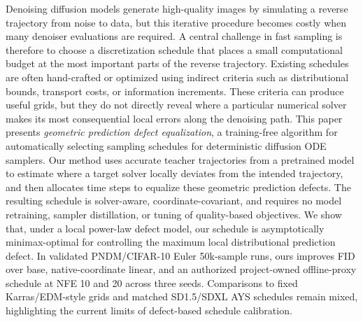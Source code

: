 Denoising diffusion models generate high-quality images by simulating a
reverse trajectory from noise to data, but this iterative procedure becomes
costly when many denoiser evaluations are required. A central challenge in fast
sampling is therefore to choose a discretization schedule that places a small
computational budget at the most important parts of the reverse trajectory.
Existing schedules are often hand-crafted or optimized using indirect criteria
such as distributional bounds, transport costs, or information increments.
These criteria can produce useful grids, but they do not directly reveal where
a particular numerical solver makes its most consequential local errors along
the denoising path. This paper presents \emph{geometric prediction defect
equalization}, a training-free algorithm for automatically selecting sampling
schedules for deterministic diffusion ODE samplers. Our method uses accurate
teacher trajectories from a pretrained model to estimate where a target solver
locally deviates from the intended trajectory, and then allocates time steps to
equalize these geometric prediction defects. The resulting
schedule is solver-aware, coordinate-covariant, and requires no model
retraining, sampler distillation, or tuning of quality-based objectives. We
show that, under a local power-law defect model, our schedule is asymptotically
minimax-optimal for controlling the maximum local distributional prediction
defect. In validated PNDM/CIFAR-10 Euler 50k-sample runs, ours improves
FID over base, native-coordinate linear, and an authorized project-owned
offline-proxy schedule at NFE 10 and 20 across three seeds. Comparisons to
fixed Karras/EDM-style grids and matched SD1.5/SDXL AYS schedules remain
mixed, highlighting the current limits of defect-based schedule calibration.
